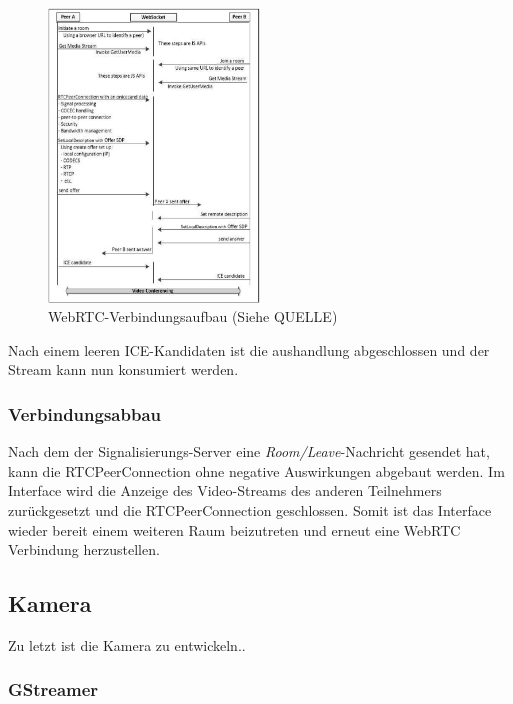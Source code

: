 \documentclass{IEEEtran}
\begin{document}
\begin{twocolumn}

\begin{figure}[ht]
	\includegraphics[width=0.5\textwidth]{cited-webrtc-connection-establishment}
	\centering
	\caption{WebRTC-Verbindungsaufbau (Siehe QUELLE)}
\end{figure}


Nach einem leeren ICE-Kandidaten ist die aushandlung abgeschlossen und der
Stream kann nun konsumiert werden.

\subsubsection{Verbindungsabbau}

Nach dem der Signalisierungs-Server eine \textit{Room/Leave}-Nachricht gesendet
hat, kann die RTCPeerConnection ohne negative Auswirkungen abgebaut werden. Im
Interface wird die Anzeige des Video-Streams des anderen Teilnehmers
zurückgesetzt und die RTCPeerConnection geschlossen. Somit ist das Interface
wieder bereit einem weiteren Raum beizutreten und erneut eine WebRTC Verbindung
herzustellen.


\subsection{Kamera}

Zu letzt ist die Kamera zu entwickeln..

\subsubsection{GStreamer}


\end{twocolumn}
\end{document}
